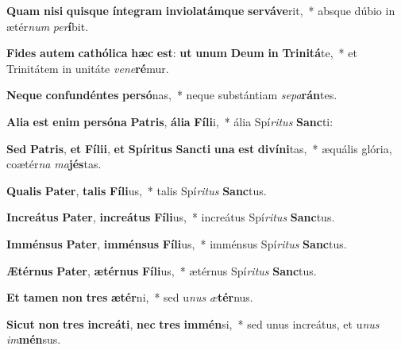\item \textbf{Quam} \textbf{ni}\textbf{si} \textbf{quis}\textbf{que} \textbf{ín}\textbf{te}\textbf{gram} \textbf{in}\textbf{vi}\textbf{o}\textbf{la}\textbf{tám}\textbf{que} \textbf{ser}\textbf{vá}\textbf{ve}rit,~* absque dúbio in ætér\textit{num} \textit{per}\textbf{í}bit.
\item \textbf{Fi}\textbf{des} \textbf{au}\textbf{tem} \textbf{ca}\textbf{thó}\textbf{li}\textbf{ca} \textbf{hæc} \textbf{est}: \textbf{ut} \textbf{u}\textbf{num} \textbf{De}\textbf{um} \textbf{in} \textbf{Tri}\textbf{ni}\textbf{tá}te,~* et Trinitátem in unitáte \textit{ve}\textit{ne}\textbf{ré}mur.
\item \textbf{Ne}\textbf{que} \textbf{con}\textbf{fun}\textbf{dén}\textbf{tes} \textbf{per}\textbf{só}nas,~* neque substántiam \textit{se}\textit{pa}\textbf{rán}tes.
\item \textbf{A}\textbf{li}\textbf{a} \textbf{est} \textbf{e}\textbf{nim} \textbf{per}\textbf{só}\textbf{na} \textbf{Pa}\textbf{tris}, \textbf{á}\textbf{li}\textbf{a} \textbf{Fí}\textbf{li}i,~* ália Spí\textit{ri}\textit{tus} \textbf{Sanc}ti:
\item \textbf{Sed} \textbf{Pa}\textbf{tris}, \textbf{et} \textbf{Fí}\textbf{li}\textbf{i}, \textbf{et} \textbf{Spí}\textbf{ri}\textbf{tus} \textbf{Sanc}\textbf{ti} \textbf{u}\textbf{na} \textbf{est} \textbf{di}\textbf{ví}\textbf{ni}tas,~* æquális glória, coætér\textit{na} \textit{ma}\textbf{jés}tas.
\item \textbf{Qua}\textbf{lis} \textbf{Pa}\textbf{ter}, \textbf{ta}\textbf{lis} \textbf{Fí}\textbf{li}us,~* talis Spí\textit{ri}\textit{tus} \textbf{Sanc}tus.
\item \textbf{In}\textbf{cre}\textbf{á}\textbf{tus} \textbf{Pa}\textbf{ter}, \textbf{in}\textbf{cre}\textbf{á}\textbf{tus} \textbf{Fí}\textbf{li}us,~* increátus Spí\textit{ri}\textit{tus} \textbf{Sanc}tus.
\item \textbf{Im}\textbf{mén}\textbf{sus} \textbf{Pa}\textbf{ter}, \textbf{im}\textbf{mén}\textbf{sus} \textbf{Fí}\textbf{li}us,~* imménsus Spí\textit{ri}\textit{tus} \textbf{Sanc}tus.
\item \textbf{Æ}\textbf{tér}\textbf{nus} \textbf{Pa}\textbf{ter}, \textbf{æ}\textbf{tér}\textbf{nus} \textbf{Fí}\textbf{li}us,~* ætérnus Spí\textit{ri}\textit{tus} \textbf{Sanc}tus.
\item \textbf{Et} \textbf{ta}\textbf{men} \textbf{non} \textbf{tres} \textbf{æ}\textbf{tér}ni,~* sed u\textit{nus} \textit{æ}\textbf{tér}nus.
\item \textbf{Sic}\textbf{ut} \textbf{non} \textbf{tres} \textbf{in}\textbf{cre}\textbf{á}\textbf{ti}, \textbf{nec} \textbf{tres} \textbf{im}\textbf{mén}si,~* sed unus increátus, et u\textit{nus} \textit{im}\textbf{mén}sus.
